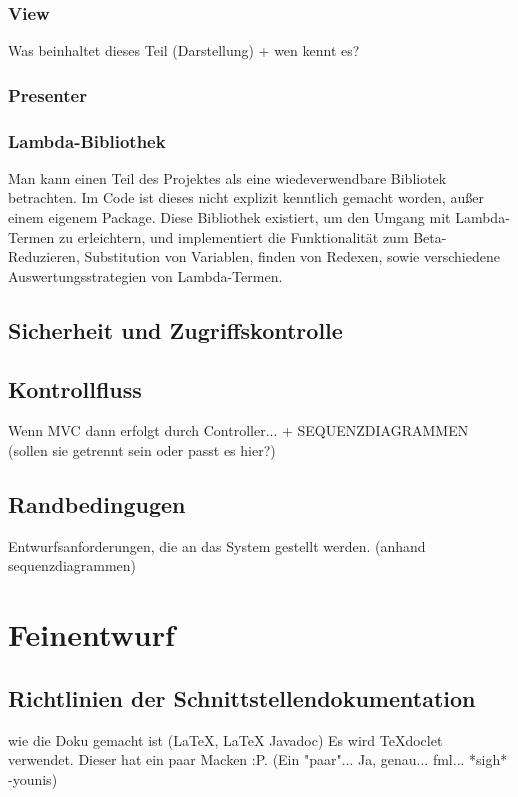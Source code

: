 \documentclass[parskip=full,11pt,twoside]{scrbook}
\begin{document}
\subsubsection{View}
Was beinhaltet dieses Teil (Darstellung) + wen kennt es?
\subsubsection{Presenter}

\subsubsection{Lambda-Bibliothek}
Man kann einen Teil des Projektes als eine wiedeverwendbare Bibliotek betrachten. Im Code ist dieses nicht
explizit kenntlich gemacht worden, außer einem eigenem Package.
Diese Bibliothek existiert, um den Umgang mit Lambda-Termen zu erleichtern, und implementiert die
Funktionalität zum Beta-Reduzieren, Substitution von Variablen, finden von Redexen, sowie verschiedene Auswertungsstrategien von Lambda-Termen.


\subsection{Sicherheit und Zugriffskontrolle}
\subsection{Kontrollfluss}
Wenn MVC dann erfolgt durch Controller...  + SEQUENZDIAGRAMMEN (sollen sie getrennt sein oder passt es hier?)
\subsection{Randbedingugen}
Entwurfsanforderungen, die an das System gestellt werden. (anhand sequenzdiagrammen)
\pagebreak

\section{Feinentwurf}



\subsection{Richtlinien der Schnittstellendokumentation}

wie die Doku gemacht ist (LaTeX, LaTeX Javadoc)
Es wird TeXdoclet verwendet. Dieser hat ein paar Macken :P. (Ein "paar"... Ja, genau... fml... *sigh* -younis)
\end{document}
